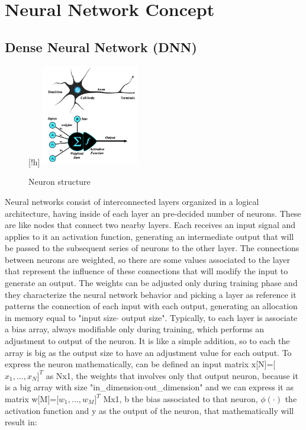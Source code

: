 \section{Neural Network Concept}
\subsection{Dense Neural Network (DNN)}
\begin{figure}
  \begin{center}[!h]
    \includegraphics[width=0.38\textwidth]{images/2.04 Neuron.png}
  \end{center}
  \caption{Neuron structure}
\end{figure}
Neural networks consist of interconnected layers organized in a logical architecture, having inside of each layer an pre-decided number of neurons\cite{neural_network_theory}. These are like nodes that connect two nearby layers. Each receives an input signal and applies to it an activation function, generating an intermediate output that will be passed to the subsequent series of neurons to the other layer. The connections between neurons are weighted, so there are some values associated to the layer that represent the influence of these connections that will modify the input to generate an output. The weights can be adjusted only during training phase and they characterize the neural network behavior and picking a layer as reference it patterns the connection of each input with each output, generating an allocation in memory equal to "input size$\cdot$ output size". Typically, to each layer is associate a bias array, always modifiable only during training, which performs an adjustment to output of the neuron. It is like a simple addition, so to each the array is big as the output size to have an adjustment value for each output.\newline
To express the neuron mathematically, can be defined an input matrix x[N]=[$x_1,...,x_N$$]^T$ as
Nx1, the weights that involves only that output neuron, because it is a big array with size "in\_dimension$\cdot$out\_dimension" and we can express it as matrix w[M]=[$w_1,...,w_M$$]^T$  Mx1, b the bias associated to that neuron, $\phi(\cdot)$ the activation function and y as the output of the neuron, that mathematically will result in:
